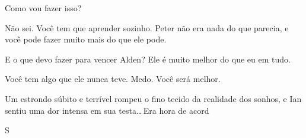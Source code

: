 Como vou fazer isso?

{\Large Não sei. Você tem que aprender sozinho. Peter não era nada do
que parecia, e você pode fazer muito mais do que ele pode.}

E o que devo fazer para vencer Alden? Ele é muito melhor do que eu em
tudo.

{\Large Você tem algo que ele nunca teve. Medo. Você será melhor.}

Um estrondo súbito e terrível rompeu o fino tecido da realidade dos
sonhos, e Ian sentiu uma dor intensa em sua testa\ldots\,Era hora de acord

  \begin{center}
  \fontsize{120}{70}\selectfont S
  \end{center}
